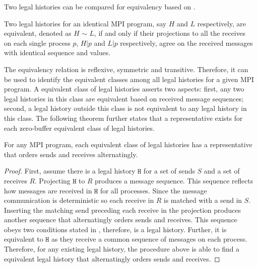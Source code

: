
Two legal histories can be compared for equivalency based on .  

\begin{definition}\label{def:er}
Two legal histories for an identical MPI program, say $H$ and $L$ respectively, are equivalent, denoted as $H$ $\sim$ $L$, if and only if their projections to all the receives on each single process $p$, $H | p$ and $L | p$ respectively, agree on the received messages with identical sequence and values.
\end{definition}

The equivalency relation is reflexive, symmetric and transitive. Therefore, it can be used to identify the equivalent classes among all legal histories for a given MPI program. A equivalent class of legal histories asserts two aspects: first, any two legal histories in this class are equivalent based on received message sequences; second, a legal history outside this class is not equivalent to any legal history in this class. The following theorem further states that a representative exists for each zero-buffer equivalent class of legal histories. 

\begin{theorem}
For any MPI program, each equivalent class of legal histories has a representative that orders sends and receives alternatingly.
\end{theorem}

\begin{proof}
First, assume there is a legal history $\mathtt{H}$ for a set of sends $\mathit{S}$ and a set of receives $\mathit{R}$. 
Projecting $\mathtt{H}$ to $\mathit{R}$ produces a message sequence. This sequence reflects how messages are received in $\mathtt{H}$ for all processes. Since the message communication is deterministic so each receive in $\mathit{R}$ is matched with a send in $\mathit{S}$. Inserting the matching send preceding each receive in the projection produces another sequence that alternatingly orders sends and receives. This sequence obeys two conditions stated in , therefore, is a legal history. Further, it is equivalent to $\mathtt{H}$ as they receive a common sequence of messages on each process.
Therefore, for any existing legal history, the procedure above is able to find a equivalent legal history that alternatingly orders sends and receives.  
\end{proof}



 


